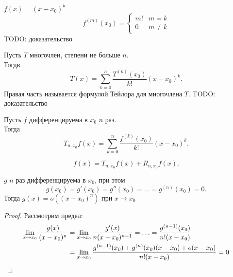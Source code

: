 \documentclass[11pt, oneside]{article}   	%
\begin{document}
    \begin{tlemma}
        $f(x) = (x-x_0)^{k}$
        \begin{equation*}
            f^{(m)}(x_0) = \begin{cases}
                m! & m = k\\
                0 & m \neq k
            \end{cases}
        \end{equation*}
        TODO: доказательство
    \end{tlemma}
    \begin{theorem}
        Пусть $T$ многочлен, степени не больше $n$.\\
        Тогдв
        \[ T(x) = \sum\limits_{k=0}^{n} \frac{T^{(k)}(x_0)}{k!}(x-x_0)^{k} .\]
        Правая часть называется формулой Тейлора для многочлена $T$.
        TODO: доказательство
    \end{theorem}
    \begin{definition}
        Пусть $f$ дифференцируема в $x_0$ $n$ раз.\\
        Тогда
        \[ T_{n, x_0}f(x) = \sum\limits_{k=0}^{n} \frac{f^{(k)}(x_0)}{k!}(x-x_0)^{k} .\] 
    \end{definition}
    \begin{definition}
        \[ f(x) = T_{n, x_0}f(x) + R_{n, x_0} f(x) .\] 
    \end{definition}
    \begin{dlemma}
        $g$  $n$ раз дифференцируема в $x_0$, при этом
        \[ g(x_0) = g'(x_0) = g''(x_0) = \ldots = g^{(n)}(x_0) = 0 .\]
        Тогда $g(x) = o\left( (x-x_0)^{n} \right) $ при $x \to x_0$
        \begin{proof}
            Рассмотрим предел:
            \begin{equation*}
                \begin{split}
                    \lim\limits_{x \to x_0} \frac{g(x)}{(x-x_0)^{n}} &= \lim\limits_{x \to x_0} \frac{g'(x)}{n(x-x_0)^{n-1}} = \ldots = \frac{g^{(n-1)}(x_0)}{n!(x-x_0)}\\
                    &= \lim\limits_{x \to x_0} \frac{g^{(n-1)}(x_0) + g^{(n)}(x_0)(x-x_0) + o(x-x_0)}{n!(x-x_0)} = 0 \qedhere
                \end{split}
            \end{equation*}
        \end{proof}
    \end{dlemma}
\end{document}
